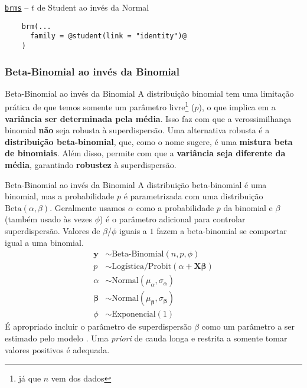 \begin{frame}[fragile]{\href{https://paul-buerkner.github.io/brms/}{\texttt{brms}} -- $t$ de Student ao invés da Normal}
    \begin{lstlisting}
    brm(...
      family = @student(link = "identity")@
    )
    \end{lstlisting}
\end{frame}

\subsubsection{Beta-Binomial ao invés da Binomial}
\begin{frame}{Beta-Binomial ao invés da Binomial}
    A distribuição binomial tem uma limitação prática de que temos somente um
    parâmetro livre\footnote{já que $n$ vem dos dados} ($p$), o que implica em
    a \textbf{variância ser determinada pela média}. Isso faz com que a verossimilhança
    binomial \textbf{não} seja robusta à superdispersão.
    \vfill
    Uma alternativa robusta é a \textbf{distribuição beta-binomial}, que, como o nome
    sugere, é uma \textbf{mistura beta de binomiais}. Além disso, permite com que
    a \textbf{variância seja diferente da média}, garantindo \textbf{robustez}
    à superdispersão.
\end{frame}

\begin{frame}{Beta-Binomial ao invés da Binomial}
    A distribuição beta-binomial é uma binomial, mas a probabilidade $p$ é parametrizada
    com uma distribuição $\text{Beta}(\alpha, \beta)$. Geralmente usamos $\alpha$ como
    a probabilidade $p$ da binomial e $\beta$ (também usado às vezes $\phi$) é o parâmetro adicional para controlar
    superdispersão. Valores de $\beta$/$\phi$ iguais a $1$ fazem a beta-binomial se comportar
    igual a uma binomial.
    $$
    \begin{aligned}
        \boldsymbol{y} &\sim \text{Beta-Binomial}(n, p, \phi) \\
        p &\sim \text{Logística/Probit}(\alpha +  \mathbf{X} \boldsymbol{\beta}) \\
        \alpha &\sim \text{Normal}(\mu_\alpha, \sigma_\alpha) \\
        \boldsymbol{\beta} &\sim \text{Normal}(\mu_{\boldsymbol{\beta}}, \sigma_{\boldsymbol{\beta}}) \\
        \phi &\sim \text{Exponencial}(1)
    \end{aligned}
    $$
    \small
    É apropriado incluir o parâmetro de superdispersão $\beta$ como um parâmetro a
    ser estimado pelo modelo \parencite{gelman2013bayesian,mcelreath2020statistical}.
    Uma \textit{priori} de cauda longa e restrita a somente tomar valores positivos é
    adequada.
\end{frame}

